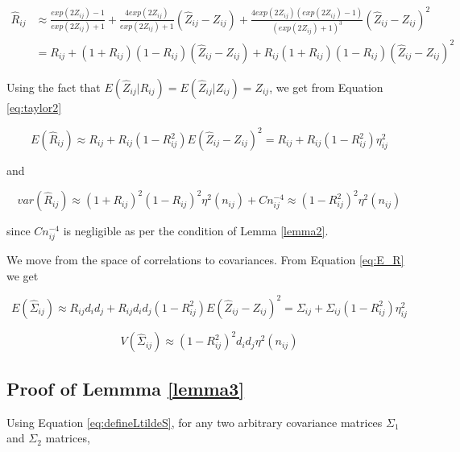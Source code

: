\begin{align}\label{eq:taylor2}
 \hat{R}_{ij} & \approx  \frac{exp(2 Z_{ij}) - 1 }{exp(2 Z_{ij}) + 1} + \frac{4 exp(2 Z_{ij})}{exp(2 Z_{ij}) + 1} (\hat{Z}_{ij} - Z_{ij}) +  \frac{4exp(2Z_{ij}){\left (exp(2Z_{ij}) - 1 \right )}}{\left (exp(2Z_{ij}) + 1 \right )^3} (\hat{Z}_{ij} - Z_{ij})^2 \\ 
& = R_{ij} + (1+R_{ij})(1-R_{ij})  (\hat{Z}_{ij} - Z_{ij}) + R_{ij} (1+R_{ij})(1-R_{ij}) (\hat{Z}_{ij} - Z_{ij})^2
\end{align}

Using the fact that $E(\hat{Z}_{ij} | R_{ij} ) = E(\hat{Z}_{ij} | Z_{ij})  = Z_{ij}$, we get from Equation \ref {eq:taylor2}

\begin{equation}\label{eq:E_R}
    E(\hat{R}_{ij}) \approx R_{ij} + R_{ij} (1 - R^2_{ij}) E (\hat{Z}_{ij} - Z_{ij})^2 = R_{ij} + R_{ij} (1 - R^2_{ij}) \eta^2_{ij} 
\end{equation}

and 

\begin{equation}\label{eq:V_R}
    var (\hat{R}_{ij}) \approx (1+R_{ij})^2(1 - R_{ij})^2 \eta^2 (n_{ij}) + Cn^{-4}_{ij} \approx (1- R^2_{ij})^2 \eta^2 (n_{ij})
\end{equation}

since $Cn^{-4}_{ij}$ is negligible as per the condition of Lemma \ref{lemma2}. 

We move from the space of correlations to covariances. From Equation \ref{eq:E_R} we get 

\begin{equation}\label{eq:E_Sigma}
    E(\hat{\Sigma}_{ij}) \approx  R_{ij}d_{i}d_{j} + R_{ij}d_{i}d_{j} (1 - R^2_{ij}) E (\hat{Z}_{ij} - Z_{ij})^2 = \Sigma_{ij} + \Sigma_{ij} (1 - R^2_{ij}) \eta^2_{ij} 
\end{equation}

\begin{equation}\label{eq:V_Sigma}
    V(\hat{\Sigma}_{ij}) \approx  (1- R^2_{ij})^2 d_i d_j \eta^2 (n_{ij})
\end{equation}





\subsection{Proof of Lemmma \ref{lemma3}}

Using Equation \ref{eq:defineLtildeS}, for any two arbitrary covariance matrices $\Sigma_1$ and $\Sigma_2$ matrices,

